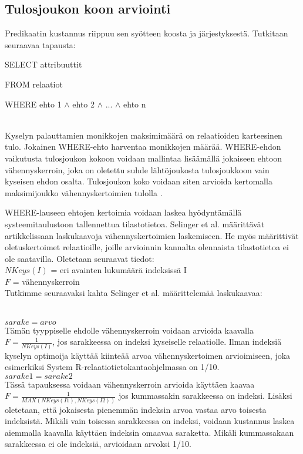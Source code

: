 \documentclass[finnish]{tktltiki2}
\theoremstyle{definition}
\theoremstyle{remark}
\begin{document}
\subsection{Tulosjoukon koon arviointi}
Predikaatin kustannus riippuu sen syötteen koosta ja järjestyksestä. Tutkitaan seuraavaa tapausta:
\newline

\begin{frame}

SELECT attribuuttit

FROM relaatiot

WHERE ehto 1 $\wedge$ ehto 2 $\wedge$ ... $\wedge$ ehto n
\end{frame}
\\\newline
Kyselyn palauttamien monikkojen maksimimäärä on relaatioiden karteesinen tulo. Jokainen WHERE-ehto harventaa monikkojen määrää. WHERE-ehdon vaikutusta tulosjoukon kokoon voidaan mallintaa lisäämällä jokaiseen ehtoon vähennyskerroin, joka on oletettu suhde lähtöjoukosta tulosjoukkoon vain kyseisen ehdon osalta. 
Tulosjoukon koko voidaan siten arvioida kertomalla maksimijoukko vähennyskertoimien tulolla \cite{ramakrishnan2003database}. 

WHERE-lauseen ehtojen kertoimia voidaan laskea hyödyntämällä systeemitaulustoon tallennettua tilastotietoa. Selinger et al. määrittävät artikkelissaan \cite{selinger1979access} laskukaavoja vähennyskertoimien laskemiseen. He myös määrittivät oletuskertoimet relaatioille, joille arvioinnin kannalta olennaista tilastotietoa ei ole saatavilla. Oletetaan seuraavat tiedot:
\\\newline
$NKeys(I)$ = eri avainten lukumäärä indeksissä I
\\
$F$ = vähennyskerroin
\\\newline
Tutkimme seuraavaksi kahta Selinger et al. määrittelemää laskukaavaa:

\\\newline
$sarake = arvo$ 
\\
Tämän tyyppiselle ehdolle vähennyskerroin voidaan arvioida kaavalla $F = \frac{1}{NKeys(I)}$, jos sarakkeessa on indeksi kyseiselle relaatiolle. Ilman indeksiä kyselyn optimoija käyttää kiinteää arvoa vähennyskertoimen arvioimiseen, joka esimerkiksi System R-relaatiotietokantaohjelmassa on 1/10.
\\\newline
$sarake1 = sarake2$ 
\\
Tässä tapauksessa voidaan vähennyskerroin arvioida käyttäen kaavaa $F = \frac{1}{MAX (NKeys(I1), NKeys(I2))}$ jos kummassakin sarakkeessa on indeksi. Lisäksi oletetaan, että jokaisesta pienemmän indeksin arvoa vastaa arvo toisesta indeksistä. Mikäli vain toisessa sarakkeessa on indeksi, 
voidaan kustannus laskea aiemmalla kaavalla käyttäen indeksin omaavaa saraketta. Mikäli kummassakaan sarakkeessa ei ole indeksiä, arvioidaan arvoksi 1/10.
\end{document}
